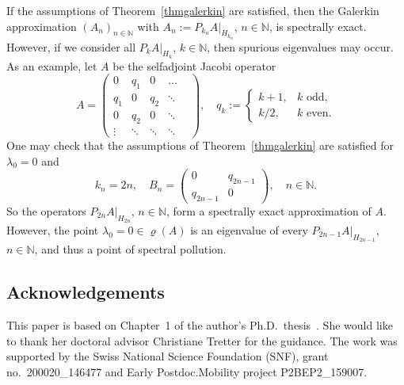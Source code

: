 \documentclass[a4paper,reqno]{amsart}
\begin{document}
\begin{rem}
If the assumptions of Theorem~\ref{thmgalerkin} are satisfied, then the Galerkin approximation $(A_n)_{n\in{\mathbb{N}}}$ with $A_n:=P_{k_n}A|_{H_{k_n}}$, $n\in{\mathbb{N}}$, is spectrally exact.
However, if we consider all $P_kA|_{H_k}$, $k\in{\mathbb{N}}$, then spurious eigenvalues may occur.
As an example, let $A$ be the selfadjoint Jacobi operator
$$A=\begin{pmatrix} 0 & q_1  & 0 & \hdots \\ q_1 & 0 & q_2 & \ddots \\ 0 & q_2 & 0 &\ddots & \\ \vdots &\ddots &\ddots  & \ddots & \end{pmatrix}, \quad 
q_k:=\begin{cases} k+1, & k\text{ odd},\\ k/2, & k\text{ even}.\end{cases}$$
One may check that the assumptions of Theorem~\ref{thmgalerkin} are satisfied for $\lambda_0=0$ and
$$k_n=2n, \quad B_n=\begin{pmatrix} 0 & q_{2n-1} \\ q_{2n-1} & 0 \end{pmatrix}, \quad n\in{\mathbb{N}}.$$
So the operators $P_{2n}A|_{H_{2n}}$, $n\in{\mathbb{N}}$, form a spectrally exact approximation of $A$.
However, the point $\lambda_0=0\in\varrho(A)$ is an eigenvalue of every $P_{2n-1}A|_{H_{2n-1}}$, $n\in{\mathbb{N}}$, and thus a point of spectral pollution.
\end{rem}

\subsection*{Acknowledgements}
This paper is based on Chapter~1 of the author's Ph.D.\ thesis~\cite{boegli-phd}. She would like to thank her doctoral advisor Christiane Tretter for the guidance.
The work was supported by 
the Swiss National Science Foundation (SNF), grant no.\ 200020\_146477 and Early Postdoc.Mobility project P2BEP2\_159007.

{\footnotesize


}
\end{document}
